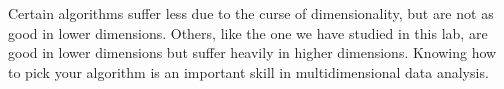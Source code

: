 Certain algorithms suffer less due to the curse of dimensionality, but are not as good in lower dimensions.
Others, like the one we have studied in this lab, are good in lower dimensions but suffer heavily in higher dimensions.
Knowing how to pick your algorithm is an important skill in multidimensional data analysis.

